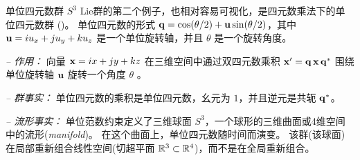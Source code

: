 
\begin{fexample}	{单位四元数群 $S^3$}
\label{ex:S3_intro}
Lie群的第二个例子，也相对容易可视化，是四元数乘法下的单位四元数群 ()。
单位四元数的形式 ${\bf q}=\cos(\theta/2)+{\bf u}\sin(\theta/2)$，其中 ${\bf u}=iu_x+ju_y+ku_z$ 是一个单位旋转轴，并且 $\theta$ 是一个旋转角度。

\emph{-- 作用：}
向量 ${\bf x}=ix+jy+kz$ 在三维空间中通过双四元数乘积 ${\bf x}'={\bf q}\,{\bf x}\,{\bf q}^*$ 围绕单位旋转轴 ${\bf u}$ 旋转一个角度 $\theta$ 。

\emph{-- 群事实：} 
单位四元数的乘积是单位四元数，幺元为 $1$，并且逆元是共轭 ${\bf q}^*$。

\emph{-- 流形事实：} 
单位范数约束定义了三维球面 $S^3$，一个球形的三维曲面或4维空间中的流形(\emph{manifold})。
在这个曲面上，单位四元数随时间而演变。
该群(该球面)在局部重新组合线性空间(切超平面 ${\mathbb R}^3\subset{\mathbb R}^4$)，而不是在全局重新组合。
\end{fexample}
